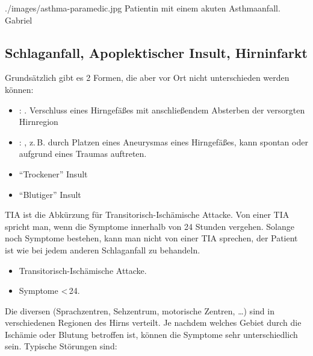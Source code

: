 {{}
{./images/asthma-paramedic.jpg}
{Patientin mit einem akuten Asthmaanfall.\label{fig:asthma-paramedic}}
{Gabriel}


\subsection{Schlaganfall, Apoplektischer Insult, Hirninfarkt}
\label{topic:tia}
\label{topic:insult}
\label{topic:schlaganfall}



{%
Grundsätzlich gibt es 2 Formen, die aber vor Ort nicht
unterschieden werden können:
\begin{itemize}
  \item {}:
  . Verschluss eines
  Hirngefäßes mit anschließendem Absterben der versorgten Hirnregion
  \item {}: , z.\,B.
  durch Platzen eines Aneurysmas eines Hirngefäßes, kann spontan
  oder aufgrund eines Traumas auftreten.
\end{itemize}

}
{
\begin{itemize}
  \item \enquote{Trockener} Insult
  \item \enquote{Blutiger} Insult
\end{itemize}

}{}{}{}

{%
\label{topic:tia}
TIA ist die Abkürzung für Transitorisch-Ischämische Attacke.
Von einer TIA spricht man, wenn die Symptome  innerhalb von
24 Stunden vergehen. Solange noch Symptome bestehen, kann
man nicht von einer TIA sprechen, der Patient ist wie bei
jedem anderen Schlaganfall zu behandeln.
\bigskip
}
{
\begin{itemize}
  \item Transitorisch-Ischämische Attacke.
  \item Symptome <\,24\Hour*.
\end{itemize}

}{}{}{}


{%
\label{topic:hirndruckzeichen}
Die diversen 
(Sprachzentren, Sehzentrum, motorische Zentren, \ldots)
sind in verschiedenen Regionen des Hirns verteilt. Je
nachdem welches Gebiet durch die Ischämie oder Blutung
betroffen ist, können die Symptome sehr unterschiedlich
sein.  Typische Störungen sind:

}}
